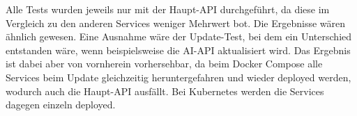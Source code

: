 Alle Tests wurden jeweils nur mit der Haupt-API durchgeführt, da diese im Vergleich zu den anderen Services weniger Mehrwert bot. 
Die Ergebnisse wären ähnlich gewesen. Eine Ausnahme wäre der Update-Test, bei dem ein Unterschied entstanden wäre, wenn beispielsweise die AI-API aktualisiert wird.
Das Ergebnis ist dabei aber von vornherein vorhersehbar, da beim Docker Compose alle Services beim Update gleichzeitig heruntergefahren und wieder deployed werden, wodurch auch die Haupt-API ausfällt. Bei Kubernetes werden die Services dagegen einzeln deployed.
